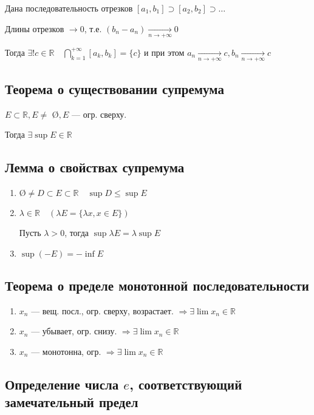 Дана последовательность отрезков $[a_1, b_1]\supset[a_2, b_2]\supset\ldots$

Длины отрезков $\to 0$, т.е. $(b_n-a_n)\xrightarrow[n\to+\infty]{} 0$

Тогда $\exists!c\in\mathbb{R} \quad \bigcap\limits_{k=1}^{+\infty}[a_k, b_k]=\{c\}$ и при этом $a_n\xrightarrow[n\to+\infty]{} c, b_n\xrightarrow[n\to+\infty]{} c$

\subsection{Теорема о существовании супремума}

$E\subset \mathbb{R}, E\not=$ \O $, E$ --- огр. сверху.

Тогда $\exists\sup E \in\mathbb{R}$

\subsection{Лемма о свойствах супремума}

\begin{enumerate}
    \item $\text{\O}\not =D\subset E\subset \mathbb{R} \quad \sup D\leq \sup E$
    \item $\lambda\in\mathbb{R} \quad (\lambda E=\{\lambda x, x\in E\})$

    Пусть $\lambda>0$, тогда $\sup \lambda E=\lambda\sup E$
    \item $\sup(-E)=-\inf E$
\end{enumerate}

\subsection{Теорема о пределе монотонной последовательности}

\begin{enumerate}
    \item $x_n$ --- вещ. посл., огр. сверху, возрастает. $\Rightarrow \exists\lim x_n\in\mathbb{R}$
    \item $x_n$ --- убывает, огр. снизу. $\Rightarrow \exists \lim x_n\in\mathbb{R}$
    \item $x_n$ --- монотонна, огр. $\Rightarrow \exists \lim x_n\in\mathbb{R}$
\end{enumerate}

\subsection{Определение числа $e$, соответствующий замечательный предел}

